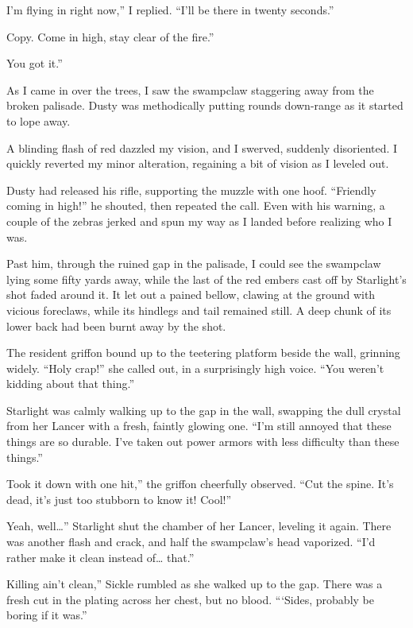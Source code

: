 \leavevmode{}I’m flying in right now,” I replied. “I’ll be there in twenty seconds.”

\leavevmode{}Copy. Come in high, stay clear of the fire.”

\leavevmode{}You got it.”

As I came in over the trees, I saw the swampclaw staggering away from the broken palisade. Dusty was methodically putting rounds down-range as it started to lope away.

A blinding flash of red dazzled my vision, and I swerved, suddenly disoriented. I quickly reverted my minor alteration, regaining a bit of vision as I leveled out.

Dusty had released his rifle, supporting the muzzle with one hoof. “Friendly coming in high!” he shouted, then repeated the call. Even with his warning, a couple of the zebras jerked and spun my way as I landed before realizing who I was.

Past him, through the ruined gap in the palisade, I could see the swampclaw lying some fifty yards away, while the last of the red embers cast off by Starlight’s shot faded around it. It let out a pained bellow, clawing at the ground with vicious foreclaws, while its hindlegs and tail remained still. A deep chunk of its lower back had been burnt away by the shot.

The resident griffon bound up to the teetering platform beside the wall, grinning widely. “Holy crap!” she called out, in a surprisingly high voice. “You weren’t kidding about that thing.”

Starlight was calmly walking up to the gap in the wall, swapping the dull crystal from her Lancer with a fresh, faintly glowing one. “I’m still annoyed that these things are so durable. I’ve taken out power armors with less difficulty than these things.”

\leavevmode{}Took it down with one hit,” the griffon cheerfully observed. “Cut the spine. It’s dead, it’s just too stubborn to know it! Cool!”

\leavevmode{}Yeah, well…” Starlight shut the chamber of her Lancer, leveling it again. There was another flash and crack, and half the swampclaw’s head vaporized. “I’d rather make it clean instead of… that.”

\leavevmode{}Killing ain’t clean,” Sickle rumbled as she walked up to the gap. There was a fresh cut in the plating across her chest, but no blood. “‘Sides, probably be boring if it was.”

